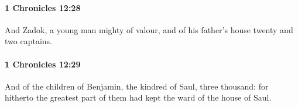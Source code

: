 		\paragraph{1 Chronicles 12:28} %
			\label{1CHRONICLES-12-28}

			And Zadok, a young man mighty of valour, and of his father’s house twenty and two captains.


		\paragraph{1 Chronicles 12:29} %
			\label{1CHRONICLES-12-29}

			And of the children of Benjamin, the kindred of Saul, three thousand: for hitherto the greatest part of them had kept the ward of the house of Saul.


